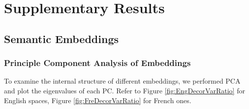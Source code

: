 \chapter{Supplementary Results} %
\label{app:suppresults}
\section{Semantic Embeddings}
\subsection{Principle Component Analysis of Embeddings}

To examine the internal structure of different embeddings, we performed PCA and plot the eigenvalues of each PC. Refer to Figure \ref{fig:EngDecorVarRatio} for English spaces, Figure \ref{fig:FreDecorVarRatio} for French ones. 

